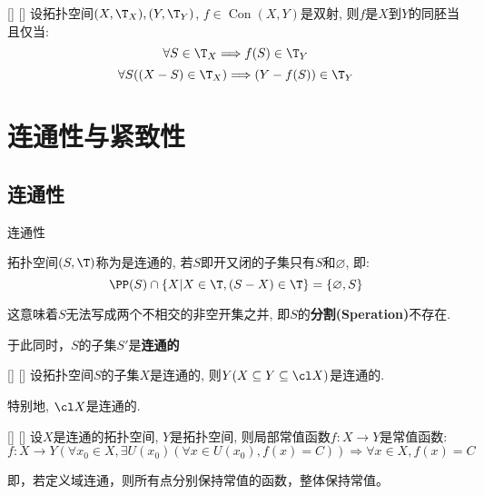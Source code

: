 \documentclass[UTF8]{ctexart}
\DeclareMathOperator{\Con}{Con}
\begin{document}
            \begin{thm}
                []
                {}
                []
                []
                设拓扑空间$(X,\T_X),(Y,\T_Y)$, $f\in\Con(X,Y)$是双射, 则$f$是$X$到$Y$的同胚当且仅当: 
                \[\forall S\in\T_X\Longrightarrow f(S)\in\T_Y\]
                \[\forall S((X-S)\in\T_X)\Longrightarrow(Y-f(S))\in\T_Y\]
            \end{thm}

    \section{连通性与紧致性}

        \subsection{连通性}
            
            \begin{dfn}
                {连通性}

                拓扑空间$(S,\T)$称为是连通的, 若$S$即开又闭的子集只有$S$和$\varnothing$, 即: 
                \[\PP(S)\cap\{X|X\in\T,(S-X)\in\T\}=\{\varnothing,S\}\]

                这意味着$S$无法写成两个不相交的非空开集之并, 即$S$的\textbf{分割(Speration)}不存在. 

                于此同时，$S$的子集$S'$是\textbf{连通的}
            \end{dfn}
            
            \begin{ppt}
                []
                {}
                []
                []
                设拓扑空间$S$的子集$X$是连通的, 则$Y(X\subseteq Y\subseteq\cl X)$是连通的. 
                
                特别地, $\cl X$是连通的. 
            \end{ppt}
            
            \begin{ppt}
                []
                {}
                []
                []
                设$X$是连通的拓扑空间, $Y$是拓扑空间, 则局部常值函数$f:X\to Y$是常值函数: 
                \[f:X\to Y(\forall x_0\in X, \exists U(x_0)(\forall x\in U(x_0), f(x)=C))\Longrightarrow\forall x\in X, f(x)=C\]
                
                即，若定义域连通，则所有点分别保持常值的函数，整体保持常值。
            \end{ppt}
\end{document}
